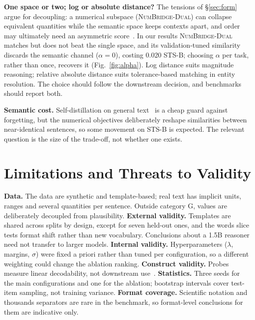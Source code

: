 \documentclass[conference]{IEEEtran}
\newcommand{\vDual}{\textup{\textsc{NumBridge-Dual}}\xspace}             %
\begin{document}
\textbf{One space or two; log or absolute distance?} The tensions of \S\ref{sec:form} argue for decoupling: a
numerical subspace (\vDual) can collapse equivalent quantities while the semantic space keeps contexts apart, and order
may ultimately need an asymmetric score~\cite{vendrov2016order}. In our results \vDual matches but does not beat the single space, and its validation-tuned similarity discards the semantic channel ($\alpha=0$), costing 0.020 STS-B; choosing $\alpha$ per task, rather than once, recovers it (Fig.~\ref{fig:alpha}). Log distance suits magnitude reasoning; relative
absolute distance suits tolerance-based matching in entity resolution. The choice should follow the downstream
decision, and benchmarks should report both.

\textbf{Semantic cost.} Self-distillation on general text~\cite{reimers2020multilingual} is a cheap guard
against forgetting, but the numerical objectives deliberately reshape similarities between near-identical sentences,
so some movement on STS-B is expected. The relevant question is the size of the trade-off, not whether one exists.

\section{Limitations and Threats to Validity}
\textbf{Data.} The data are synthetic and template-based; real text has implicit units, ranges and several
quantities per sentence. Outside category G, values are deliberately decoupled from plausibility. \textbf{External validity.} Templates are shared across splits by design, except for seven held-out ones, and the
words slice tests format shift rather than new vocabulary. Conclusions about a 1.5B reasoner need not transfer to larger
models. \textbf{Internal validity.} Hyperparameters ($\lambda$, margins, $\sigma$) were fixed a priori rather than tuned
per configuration, so a different weighting could change the ablation ranking. \textbf{Construct validity.} Probes
measure linear decodability, not downstream use~\cite{hewitt2019control}. \textbf{Statistics.} Three seeds for the main
configurations and one for the ablation; bootstrap intervals cover test-item sampling, not training variance. \textbf{Format coverage.} Scientific notation and thousands separators are rare in the benchmark, so format-level conclusions for them are indicative only.

\end{document}
